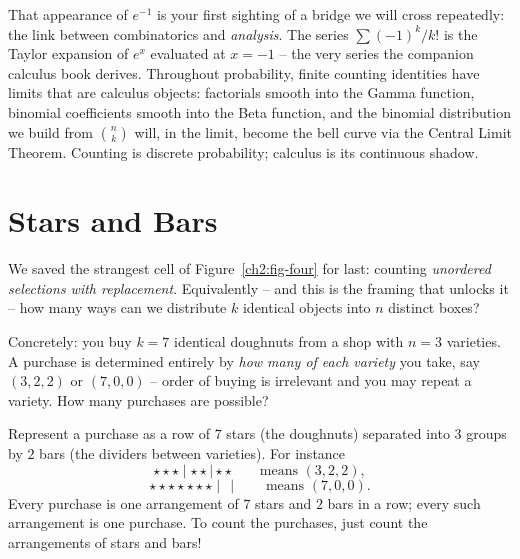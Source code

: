 \begin{connectionbox}
That appearance of $e^{-1}$ is your first sighting of a bridge we will cross repeatedly:
the link between combinatorics and \emph{analysis}. The series $\sum (-1)^k/k!$ is the
Taylor expansion of $e^x$ evaluated at $x=-1$ -- the very series the companion calculus
book derives. Throughout probability, finite counting identities have limits that are
calculus objects: factorials smooth into the Gamma function, binomial coefficients smooth
into the Beta function, and the binomial distribution we build from $\binom{n}{k}$ will, in
the limit, become the bell curve via the Central Limit Theorem. Counting is discrete
probability; calculus is its continuous shadow.
\end{connectionbox}

\section{Stars and Bars}
\label{ch2:starsbars}

We saved the strangest cell of Figure~\ref{ch2:fig-four} for last: counting
\emph{unordered selections with replacement}. Equivalently -- and this is the framing that
unlocks it -- how many ways can we distribute $k$ identical objects into $n$ distinct boxes?

Concretely: you buy $k = 7$ identical doughnuts from a shop with $n = 3$ varieties. A
purchase is determined entirely by \emph{how many of each variety} you take, say $(3,2,2)$
or $(7,0,0)$ -- order of buying is irrelevant and you may repeat a variety. How many
purchases are possible?

\begin{intuitionbox}
Represent a purchase as a row of $7$ stars (the doughnuts) separated into $3$ groups by
$2$ bars (the dividers between varieties). For instance
\[
  \star\star\star \mid \star\star \mid \star\star
  \qquad\text{means } (3,2,2),
\]
\[
  \star\star\star\star\star\star\star \mid\, \mid
  \qquad\text{means } (7,0,0).
\]
Every purchase is one arrangement of $7$ stars and $2$ bars in a row; every such
arrangement is one purchase. To count the purchases, just count the arrangements of stars
and bars!
\end{intuitionbox}


